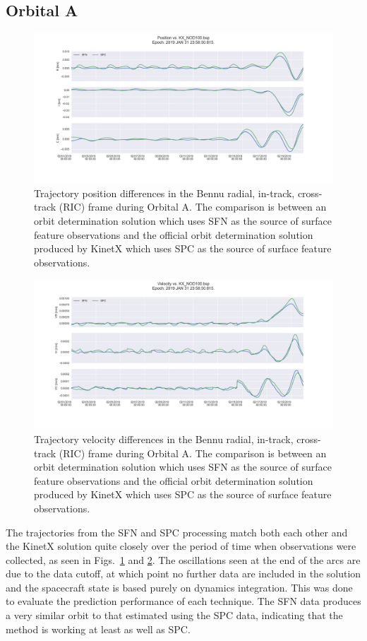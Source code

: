 \documentclass{RPI-SIW}
\begin{document}
\subsection*{Orbital A}
\begin{figure}[h]
	\centering
	\includegraphics[width=\columnwidth]{orbita_pfig.png}
    \caption{Trajectory position differences in the Bennu radial, in-track, cross-track (RIC) frame during Orbital A.  The comparison is between an orbit determination solution which uses SFN as the source of surface feature observations and the official orbit determination solution produced by KinetX which uses SPC as the source of surface feature observations.}
    \label{fig:oapos}
\end{figure}
\begin{figure}[h]
	\centering
	\includegraphics[width=\columnwidth]{orbita_vfig.png}
    \caption{Trajectory velocity differences in the Bennu radial, in-track, cross-track (RIC) frame during Orbital A.  The comparison is between an orbit determination solution which uses SFN as the source of surface feature observations and the official orbit determination solution produced by KinetX which uses SPC as the source of surface feature observations.}
    \label{fig:oavel}
\end{figure}
The trajectories from the SFN and SPC processing match both each other and the KinetX solution quite closely over the period of time when observations were collected, as seen in Figs.~\ref{fig:oapos} and \ref{fig:oavel}.  The oscillations seen at the end of the arcs are due to the data cutoff, at which point no further data are included in the solution and the spacecraft state is based purely on dynamics integration.  This was done to evaluate the prediction performance of each technique.  The SFN data produces a very similar orbit to that estimated using the SPC data, indicating that the method is working at least as well as SPC.
\end{document}
